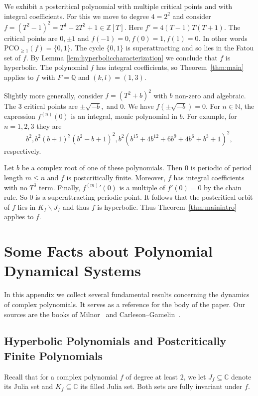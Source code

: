 \documentclass[12pt,oneside,a4]{amsart}
\newcommand{\IC}{\mathbb{C}}
\newcommand{\IN}{\mathbb{N}}
\newcommand{\IQ}{\mathbb{Q}}
\newcommand{\IZ}{\mathbb{Z}}
\numberwithin{maincounter}{section}
\numberwithin{equation}{section}
\renewcommand{\subset}{\subseteq}
\newcommand{\ssm}{\smallsetminus}
\newcommand{\pco}{\mathrm{PCO}}
\begin{document}
We exhibit a postcritical polynomial with multiple critical points and
with integral coefficients. For this we move to degree $4=2^2$ and
consider $f=(T^2-1)^2=T^4-2T^2+1\in \IZ[T]$. Here $f'=4(T-1)T(T+1)$.
The critical points are $0,\pm 1$ and $f(-1)=0,f(0)=1,f(1)=0$. In
other words $\pco_{\ge 1}(f) = \{0, 1\}$. The cycle $\{0,1\}$ is
superattracting and so lies in the Fatou set of $f$. By Lemma
\ref{lem:hyperboliccharacterization} we conclude that $f$ is
hyperbolic. The polynomial $f$ has integral coefficients, so
Theorem~\ref{thm:main} applies to $f$ with $F=\IQ$ and $(k,l)=(1,3)$.

  
Slightly more generally, consider $f = (T^2+b)^2$ with $b$ non-zero
and algebraic. The $3$ critical points are $\pm \sqrt{-b},$ and $0$.
We have $f(\pm \sqrt{-b}) = 0$. For $n\in\IN$, the expression
$f^{(n)}(0)$ is an integral, monic polynomial in $b$. For example, for
$n=1,2,3$ they are
$$b^2, b^2(b+1)^2(b^2-b+1)^2,
b^2(b^{15}+4b^{12}+6b^9+4b^6+b^3+1)^2,$$ respectively.

Let $b$ be a complex root of one of these polynomials. Then $0$ is
periodic of period length $m\le n$ and $f$ is postcritically finite.
Moreover, $f$ has integral coefficients with no $T^3$ term. Finally,
${f^{(m)}}'(0)$ is a multiple of $f'(0)=0$ by the chain rule. So $0$
is a superattracting periodic point. It follows that the postcritical
orbit of $f$ lies in $K_f\ssm J_f$ and thus $f$ is hyperbolic. Thus
Theorem~\ref{thm:mainintro} applies to $f$.



\appendix


\section{Some Facts about Polynomial Dynamical Systems}
\label{app:hyperpolys}

In this appendix we collect several fundamental results concerning the
dynamics of complex polynomials. It serves as a reference for the
body of the paper. Our sources are the books of
Milnor~\cite{Milnor} and Carleson--Gamelin~\cite{CarlesonGamelin}.


\subsection{Hyperbolic Polynomials and Postcritically Finite Polynomials}


Recall that for a complex polynomial $f$ of degree at least $2$, we
let $J_f\subset\IC$ denote its Julia set and $K_f\subset\IC$ its
filled Julia set. Both sets are fully invariant under $f$.
\end{document}
